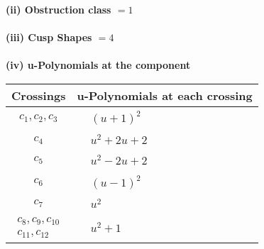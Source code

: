 \documentclass[1p]{elsarticle_modified}
\theoremstyle{definition}
\begin{document}
\flushleft \textbf{(ii) Obstruction class $= 1$}\\~\\
\flushleft \textbf{(iii) Cusp Shapes $= 4$}\\~\\
\newpage\renewcommand{\arraystretch}{1}
\flushleft \textbf{(iv) u-Polynomials at the component}\newline \\
\begin{tabular}{m{50pt}|m{274pt}}
Crossings & \hspace{64pt}u-Polynomials at each crossing \\
\hline $$\begin{aligned}c_{1},c_{2},c_{3}\end{aligned}$$&$\begin{aligned}
&(u+1)^2
\end{aligned}$\\
\hline $$\begin{aligned}c_{4}\end{aligned}$$&$\begin{aligned}
&u^2+2 u+2
\end{aligned}$\\
\hline $$\begin{aligned}c_{5}\end{aligned}$$&$\begin{aligned}
&u^2-2 u+2
\end{aligned}$\\
\hline $$\begin{aligned}c_{6}\end{aligned}$$&$\begin{aligned}
&(u-1)^2
\end{aligned}$\\
\hline $$\begin{aligned}c_{7}\end{aligned}$$&$\begin{aligned}
&u^2
\end{aligned}$\\
\hline $$\begin{aligned}c_{8},c_{9},c_{10}\\c_{11},c_{12}\end{aligned}$$&$\begin{aligned}
&u^2+1
\end{aligned}$\\
\hline
\end{tabular}\\~\\
\end{document}
